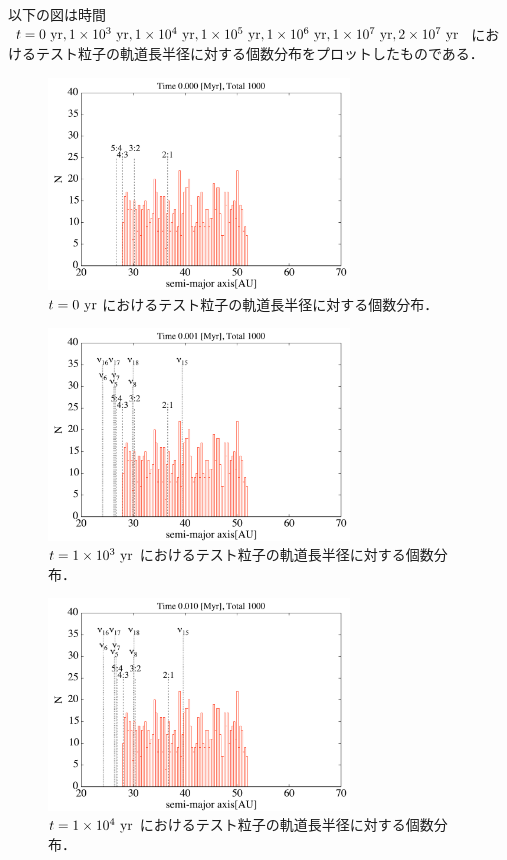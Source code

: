 \documentclass[11pt,a4paper,oneside,onecolumn]{jreport}
\begin{document}
以下の図は時間 $t = 0\ {\rm yr}, 1 \times 10^3\ {\rm yr}, 1 \times 10^4\ {\rm yr}, 1 \times 10^5\ {\rm yr}, 1 \times 10^6\ {\rm yr}, 1 \times 10^7\ {\rm yr}, 2 \times 10^7\ {\rm yr}$ におけるテスト粒子の軌道長半径に対する個数分布をプロットしたものである．

\begin{figure}[H]
\centering
\includegraphics[width=8cm]{./image/kuiper_histogram_0yr.pdf}
\caption{$t = 0\ {\rm yr}$ におけるテスト粒子の軌道長半径に対する個数分布．\label{fig:kuiper_histogram_0yr}}
\end{figure}

\begin{figure}[H]
\centering
\includegraphics[width=8cm]{./image/kuiper_histogram_1kyr.pdf}
\caption{$t = 1 \times 10^3\ {\rm yr}$ におけるテスト粒子の軌道長半径に対する個数分布．\label{fig:kuiper_histogram_1kyr}}
\end{figure}

\begin{figure}[H]
\centering
\includegraphics[width=8cm]{./image/kuiper_histogram_10kyr.pdf}
\caption{$t = 1 \times 10^4\ {\rm yr}$ におけるテスト粒子の軌道長半径に対する個数分布．\label{fig:kuiper_histogram_10kyr}}
\end{figure}
\end{document}
